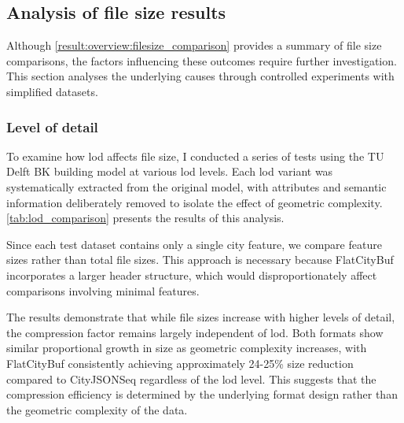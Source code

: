 \subsection{Analysis of file size results}
\label{result:overview:analysis_of_file_size_results}
Although \autoref{result:overview:filesize_comparison} provides a summary of file size comparisons, the factors influencing these outcomes require further investigation. This section analyses the underlying causes through controlled experiments with simplified datasets.

\subsubsection{Level of detail}
\label{result:overview:analysis_of_file_size_results:level_of_detail}

To examine how \ac{lod} affects file size, I conducted a series of tests using the TU Delft BK building model at various \ac{lod} levels. Each \ac{lod} variant was systematically extracted from the original model, with attributes and semantic information deliberately removed to isolate the effect of geometric complexity. \autoref{tab:lod_comparison} presents the results of this analysis.

Since each test dataset contains only a single city feature, we compare feature sizes rather than total file sizes. This approach is necessary because FlatCityBuf incorporates a larger header structure, which would disproportionately affect comparisons involving minimal features.

The results demonstrate that while file sizes increase with higher levels of detail, the compression factor remains largely independent of \ac{lod}. Both formats show similar proportional growth in size as geometric complexity increases, with FlatCityBuf consistently achieving approximately 24-25\% size reduction compared to CityJSONSeq regardless of the \ac{lod} level. This suggests that the compression efficiency is determined by the underlying format design rather than the geometric complexity of the data.


